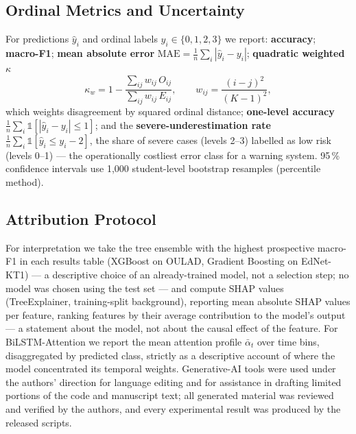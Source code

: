 \documentclass[sn-mathphys,Numbered]{sn-jnl}
\begin{document}
\subsection{Ordinal Metrics and Uncertainty}\label{sec:metrics}

For predictions $\hat{y}_i$ and ordinal labels $y_i \in \{0,1,2,3\}$ we report: \textbf{accuracy}; \textbf{macro-F1}; \textbf{mean absolute error} $\mathrm{MAE} = \frac{1}{n}\sum_i |\hat{y}_i - y_i|$; \textbf{quadratic weighted $\kappa$} \cite{Cohen1960}
\begin{equation}
  \kappa_w = 1 - \frac{\sum_{ij} w_{ij}\, O_{ij}}{\sum_{ij} w_{ij}\, E_{ij}}, \qquad
  w_{ij} = \frac{(i-j)^2}{(K-1)^2},
\end{equation}
which weights disagreement by squared ordinal distance; \textbf{one-level accuracy} $\frac{1}{n}\sum_i \mathbb{1}[|\hat{y}_i - y_i| \le 1]$; and the \textbf{severe-underestimation rate} $\frac{1}{n}\sum_i \mathbb{1}[\hat{y}_i \le y_i - 2]$, the share of severe cases (levels 2--3) labelled as low risk (levels 0--1) --- the operationally costliest error class for a warning system. 95\,\% confidence intervals use 1{,}000 student-level bootstrap resamples (percentile method).

\subsection{Attribution Protocol}\label{sec:attribution}

For interpretation we take the tree ensemble with the highest prospective macro-F1 in each results table (XGBoost on OULAD, Gradient Boosting on EdNet-KT1) --- a descriptive choice of an already-trained model, not a selection step; no model was chosen using the test set --- and compute SHAP values \cite{Lundberg2017} (TreeExplainer, training-split background), reporting mean absolute SHAP values per feature, ranking features by their average contribution to the model's output --- a statement about the model, not about the causal effect of the feature. For BiLSTM-Attention we report the mean attention profile $\bar{\alpha}_t$ over time bins, disaggregated by predicted class, strictly as a descriptive account of where the model concentrated its temporal weights. Generative-AI tools were used under the authors' direction for language editing and for assistance in drafting limited portions of the code and manuscript text; all generated material was reviewed and verified by the authors, and every experimental result was produced by the released scripts.
\end{document}
